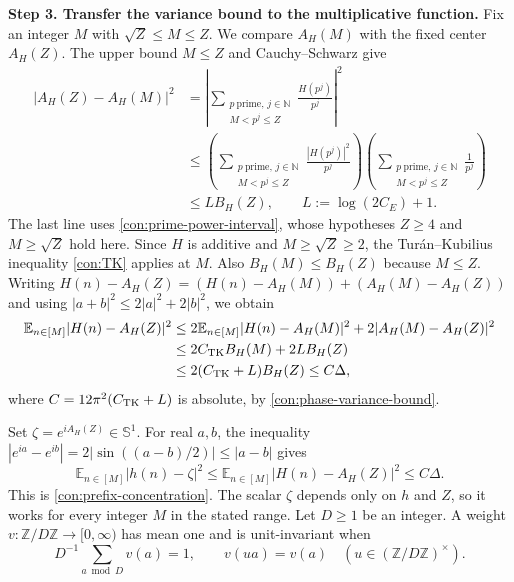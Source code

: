 \documentclass[twoside]{aomart}
\makeatletter
\theoremstyle{paperplain}
\theoremstyle{paperdefinition}
\renewenvironment{proof}[1][\proofname]{\par\pushQED{\qed}%
  \normalfont\topsep6\p@\@plus3\p@\relax\trivlist
  \item[\hskip\labelsep\itshape #1\@addpunct{.}]\ignorespaces
}{\popQED\endtrivlist\@endpefalse}
\newcommand{\E}{\mathbb E}
\newcommand{\Z}{\mathbb Z}
\newcommand{\N}{\mathbb N}
\newcommand{\M}{\mathcal M}
\numberwithin{equation}{section}
\makeatother
\begin{document}
\begin{proof}
\medskip
\noindent\textbf{Step 3. Transfer the variance bound to the multiplicative function.}
Fix an integer $M$ with $\sqrt Z\le M\le Z$.
We compare $A_H(M)$ with the fixed center $A_H(Z)$.
The upper bound $M\le Z$ and Cauchy--Schwarz give
\begin{equation*}
 \begin{aligned}
 |A_H(Z)-A_H(M)|^2
 &=\left|\sum_{\substack{p\ \mathrm{prime},\,j\in\N\\M<p^j\le Z}}\frac{H(p^j)}{p^j}\right|^2\\
 &\le
 \left(\sum_{\substack{p\ \mathrm{prime},\,j\in\N\\M<p^j\le Z}}\frac{|H(p^j)|^2}{p^j}\right)
 \left(\sum_{\substack{p\ \mathrm{prime},\,j\in\N\\M<p^j\le Z}}\frac1{p^j}\right)\\
 &\le L B_H(Z),\qquad L:=\log(2C_E)+1.
 \end{aligned}
 \end{equation*}
The last line uses \eqref{con:prime-power-interval}, whose hypotheses
$Z\ge4$ and $M\ge\sqrt Z$ hold here.
Since $H$ is additive and $M\ge\sqrt Z\ge2$, the
Tur\'an--Kubilius inequality \eqref{con:TK} applies at $M$.
Also $B_H(M)\le B_H(Z)$ because $M\le Z$.
Writing
$H(n)-A_H(Z)=(H(n)-A_H(M))+(A_H(M)-A_H(Z))$
and using $|a+b|^2\le2|a|^2+2|b|^2$, we obtain
\begin{equation*}
 \begin{aligned}
 \E_{n\in[M]}|H(n)-A_H(Z)|^2
 &\le2\E_{n\in[M]}|H(n)-A_H(M)|^2
       +2|A_H(M)-A_H(Z)|^2\\
 &\le2C_{\rm TK}B_H(M)+2LB_H(Z)\\
 &\le2(C_{\rm TK}+L)B_H(Z)
 \le C\Delta,
 \end{aligned}
\end{equation*}
where $C=12\pi^2(C_{\rm TK}+L)$ is absolute, by
\eqref{con:phase-variance-bound}.

Set $\zeta=e^{iA_H(Z)}\in\mathbb S^1$.
For real $a,b$, the inequality
$|e^{ia}-e^{ib}|=2|\sin((a-b)/2)|\le|a-b|$ gives
\begin{equation*}
 \E_{n\in[M]}|h(n)-\zeta|^2
 \le\E_{n\in[M]}|H(n)-A_H(Z)|^2
 \le C\Delta.
 \end{equation*}
This is \eqref{con:prefix-concentration}.
The scalar $\zeta$ depends only on $h$ and $Z$, so it works for
every integer $M$ in the stated range.
\end{proof}
Let $D\ge1$ be an integer. A weight $v:\Z/D\Z\to[0,\infty)$
has mean one and is unit-invariant when
\begin{equation}
 D^{-1}\sum_{a\bmod D}v(a)=1,
 \qquad v(ua)=v(a)\quad(u\in(\Z/D\Z)^\times).
 \label{con:one-dimensional-invariance}
\end{equation}
\end{document}

